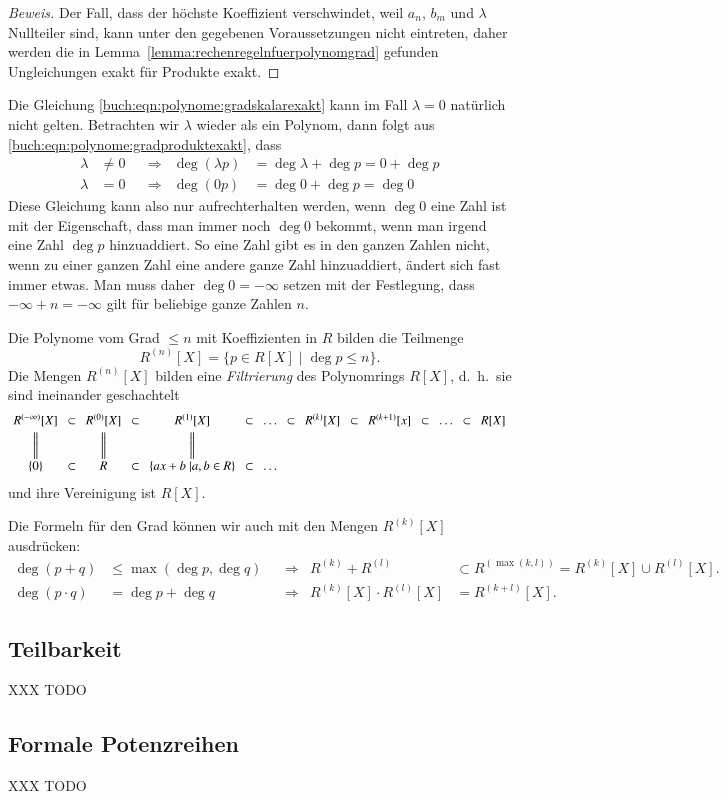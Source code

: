 \begin{proof}[Beweis]
Der Fall, dass der höchste Koeffizient verschwindet, weil $a_n$, $b_m$
und $\lambda$ Nullteiler sind, kann unter den gegebenen Voraussetzungen
nicht eintreten, daher werden die in
Lemma~\ref{lemma:rechenregelnfuerpolynomgrad} gefunden Ungleichungen
exakt für Produkte exakt.
\end{proof}

Die Gleichung
\eqref{buch:eqn:polynome:gradskalarexakt}
kann im Fall $\lambda=0$ natürlich nicht gelten.
Betrachten wir $\lambda$ wieder als ein Polynom, dann folgt aus
\eqref{buch:eqn:polynome:gradproduktexakt}, dass
\[
\begin{aligned}
\lambda&\ne 0  &&\Rightarrow& \deg (\lambda p) &= \deg\lambda + \deg p = 0+\deg p
\\
\lambda&=0     &&\Rightarrow& \deg (0 p) &= \deg 0 + \deg p = \deg 0
\end{aligned}
\]
Diese Gleichung kann also nur aufrechterhalten werden, wenn $\deg 0$ eine
Zahl ist mit der Eigenschaft, dass man immer noch $\deg 0$ bekommt,
wenn man irgend eine Zahl $\deg p$ hinzuaddiert.
So eine Zahl gibt es in den ganzen Zahlen nicht, wenn zu einer ganzen
Zahl eine andere ganze Zahl hinzuaddiert, ändert sich fast immer etwas.
Man muss daher $\deg 0 = -\infty$ setzen mit der Festlegung, dass
$-\infty + n = -\infty$ gilt für beliebige ganze Zahlen $n$.

\begin{definition}
\label{buch:def:definitionen:polynomfilterung}
Die Polynome vom Grad $\le n$ mit Koeffizienten in $R$
bilden die Teilmenge
\[
R^{(n)}[X]
=
\{ p\in R[X]\;|\; \deg p \le n\}.
\]
Die Mengen $R^{(n)}[X]$ bilden eine {\em Filtrierung} des Polynomrings
$R[X]$, d.~h.~sie sind ineinander geschachtelt
\[
\arraycolsep=4pt
\begin{array}{ccccccccccccccc}
R^{(-\infty)}[X] & \subset
	& R^{(0)}[X] & \subset
		& R^{(1)}[X] & \subset & \dots & \subset
			& R^{(k)}[X] & \subset
				& R^{(k+1)}[x] & \subset & \dots & \subset
					& R[X]\\[3pt]
\bigg\| &
	&\bigg\| &
		&\bigg\| & & & 
			&&
				&& & &
					&
\\[3pt]
\{0\} & \subset
	& R & \subset
		& \{ax+b\;|a,b\in R\} & \subset & \dots &
\end{array}
\]
und ihre Vereinigung ist $R[X]$.
\end{definition}

Die Formeln für den Grad können wir auch mit den Mengen $R^{(k)}[X]$
ausdrücken:
\begin{align*}
\deg (p+q) &\le \max(\deg p, \deg q)
&&\Rightarrow&
R^{(k)}+R^{(l)}
&\subset R^{(\max(k,l))}
=
R^{(k)}[X] \cup R^{(l)}[X].
\\
\deg (p\cdot q)&=\deg p+\deg q
&&\Rightarrow&
R^{(k)}[X] \cdot R^{(l)}[X]
&=
R^{(k+l)}[X].
\end{align*}


%
%
\subsection{Teilbarkeit
\label{buch:subsection:polynome:teilbarkeit}}
XXX TODO

%
%
\subsection{Formale Potenzreihen
\label{buch:subsection:polynome:potenzreihen}}
XXX TODO



